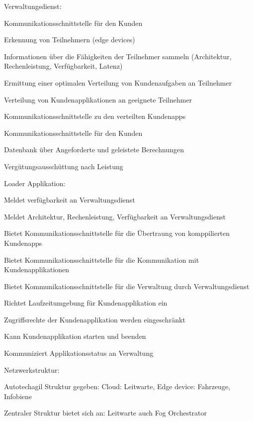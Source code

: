 \begin{notes}
\begin{notes}
        \item Verwaltungsdienst:
        \begin{notes}
            \item Kommunikationsschnittstelle für den Kunden
            \item Erkennung von Teilnehmern (edge devices)
            \item Informationen über die Fähigkeiten der Teilnehmer sammeln (Architektur, Rechenleistung, Verfügbarkeit, Latenz)
            \item Ermittung einer optimalen Verteilung von Kundenaufgaben an Teilnehmer
            \item Verteilung von Kundenapplikationen an geeignete Teilnehmer
            \item Kommunikationsschnittstelle zu den verteilten Kundenapps
            \item Kommunikationsschnittstelle für den Kunden
            \item Datenbank über Angeforderte und geleistete Berechnungen
            \item Vergütungsausschüttung nach Leistung
        \end{notes}
        \item Loader Applikation:
        \begin{notes}
            \item Meldet verfügbarkeit an Verwaltungsdienst
            \item Meldet Architektur, Rechenleistung, Verfügbarkeit an Verwaltungsdienst
            \item Bietet Kommunikationsschnittstelle für die Übertraung von komppilierten Kundenapps
            \item Bietet Kommunikationsschnittstelle für die Kommunikation mit Kundenapplikationen
            \item Bietet Kommunikationsschnittstelle für die Verwaltung durch Verwaltungsdienst
            \item Richtet Laufzeitumgebung für Kundenapplikation ein
            \item Zugriffsrechte der Kundenapplikation werden eingeschränkt
            \item Kann Kundenapplikation starten und beenden
            \item Kommuniziert Applikationsstatus an Verwaltung
        \end{notes}
    \end{notes}
    \item Netzwerkstruktur:
    \begin{notes}
        \item Autotechagil Struktur gegeben: Cloud: Leitwarte, Edge device: Fahrzeuge, Infobiene
        \item Zentraler Struktur bietet sich an: Leitwarte auch Fog Orchestrator
        \item 
    \end{notes}
\end{notes}

